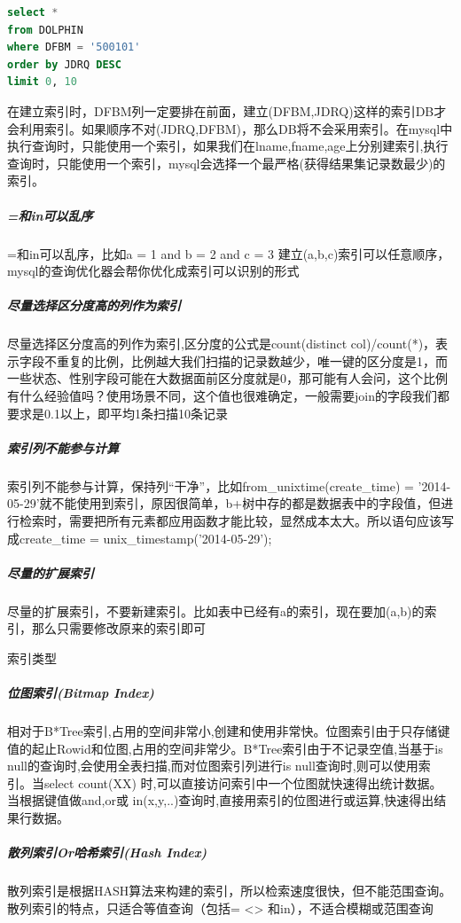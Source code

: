\documentclass[12pt]{book}
\makeatletter
\numberwithin{dummy}{section}
\theoremstyle{ocrenumbox}
\theoremstyle{blacknumex}
\theoremstyle{blacknumbox}
\theoremstyle{ocrenum}
\renewcommand{\subsection}{\@startsection {subsection}{2}{\z@}
	{-3ex \@plus -0.1ex \@minus -.4ex}
	{0.5ex \@plus.2ex }
	{\normalfont\sffamily\bfseries}}
\makeatother
\begin{document}
\begin{lstlisting}[language=SQL]
select * 
from DOLPHIN  
where DFBM = '500101'  
order by JDRQ DESC 
limit 0, 10
\end{lstlisting}

在建立索引时，DFBM列一定要排在前面，建立(DFBM,JDRQ)这样的索引DB才会利用索引。如果顺序不对(JDRQ,DFBM)，那么DB将不会采用索引。在mysql中执行查询时，只能使用一个索引，如果我们在lname,fname,age上分别建索引,执行查询时，只能使用一个索引，mysql会选择一个最严格(获得结果集记录数最少)的索引。

\subparagraph{=和in可以乱序}=和in可以乱序，比如a = 1 and b = 2 and c = 3 建立(a,b,c)索引可以任意顺序，mysql的查询优化器会帮你优化成索引可以识别的形式

\subparagraph{尽量选择区分度高的列作为索引}尽量选择区分度高的列作为索引,区分度的公式是count(distinct col)/count(*)，表示字段不重复的比例，比例越大我们扫描的记录数越少，唯一键的区分度是1，而一些状态、性别字段可能在大数据面前区分度就是0，那可能有人会问，这个比例有什么经验值吗？使用场景不同，这个值也很难确定，一般需要join的字段我们都要求是0.1以上，即平均1条扫描10条记录

\subparagraph{索引列不能参与计算}索引列不能参与计算，保持列“干净”，比如from\_unixtime(create\_time) = ’2014-05-29’就不能使用到索引，原因很简单，b+树中存的都是数据表中的字段值，但进行检索时，需要把所有元素都应用函数才能比较，显然成本太大。所以语句应该写成create\_time = unix\_timestamp(’2014-05-29’);

\subparagraph{尽量的扩展索引}尽量的扩展索引，不要新建索引。比如表中已经有a的索引，现在要加(a,b)的索引，那么只需要修改原来的索引即可

\subsection{索引类型}

\subparagraph{位图索引(Bitmap Index)}

相对于B*Tree索引,占用的空间非常小,创建和使用非常快。位图索引由于只存储键值的起止Rowid和位图,占用的空间非常少。B*Tree索引由于不记录空值,当基于is null的查询时,会使用全表扫描,而对位图索引列进行is null查询时,则可以使用索引。当select count(XX) 时,可以直接访问索引中一个位图就快速得出统计数据。当根据键值做and,or或 in(x,y,..)查询时,直接用索引的位图进行或运算,快速得出结果行数据。

\subparagraph{散列索引Or哈希索引(Hash Index)}

散列索引是根据HASH算法来构建的索引，所以检索速度很快，但不能范围查询。散列索引的特点，只适合等值查询（包括= <> 和in），不适合模糊或范围查询
\end{document}
